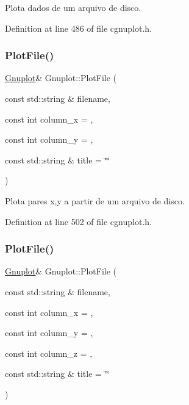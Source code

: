 Plota dados de um arquivo de disco. 



Definition at line 486 of file cgnuplot.\+h.

\mbox{\label{class_gnuplot_a68d5b282f0fc0d65d432009b55705cbd}} 
\subsubsection{\texorpdfstring{Plot\+File()}{PlotFile()}\hspace{0.1cm}{\footnotesize\ttfamily [2/3]}}
{\footnotesize\ttfamily \hyperlink{class_gnuplot}{Gnuplot}\& Gnuplot\+::\+Plot\+File (\begin{DoxyParamCaption}\item[{const std\+::string \&}]{filename,  }\item[{const int}]{column\+\_\+x = {},  }\item[{const int}]{column\+\_\+y = {},  }\item[{const std\+::string \&}]{title = {\ttfamily \char`\"{}\char`\"{}} }\end{DoxyParamCaption})\hspace{0.3cm}{\ttfamily [inline]}}



Plota pares x,y a partir de um arquivo de disco. 



Definition at line 502 of file cgnuplot.\+h.

\mbox{\label{class_gnuplot_a3f5f7127182ea22da3ee0b78f0ade35c}} 
\subsubsection{\texorpdfstring{Plot\+File()}{PlotFile()}\hspace{0.1cm}{\footnotesize\ttfamily [3/3]}}
{\footnotesize\ttfamily \hyperlink{class_gnuplot}{Gnuplot}\& Gnuplot\+::\+Plot\+File (\begin{DoxyParamCaption}\item[{const std\+::string \&}]{filename,  }\item[{const int}]{column\+\_\+x = {},  }\item[{const int}]{column\+\_\+y = {},  }\item[{const int}]{column\+\_\+z = {},  }\item[{const std\+::string \&}]{title = {\ttfamily \char`\"{}\char`\"{}} }\end{DoxyParamCaption})\hspace{0.3cm}{\ttfamily [inline]}}



